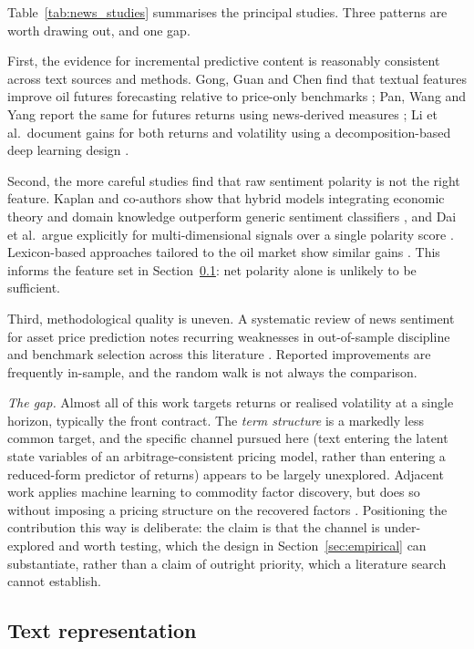 \documentclass[journal]{IEEEtran}
\begin{document}
Table~\ref{tab:news_studies} summarises the principal studies. Three patterns are worth drawing out, and one gap.

First, the evidence for incremental predictive content is reasonably consistent across text sources and methods. Gong, Guan and Chen find that textual features improve oil futures forecasting relative to price-only benchmarks \cite{Gong2022}; Pan, Wang and Yang report the same for futures returns using news-derived measures \cite{Pan2024}; Li et al.\ document gains for both returns and volatility using a decomposition-based deep learning design \cite{Li2021Sentiment}.

Second, the more careful studies find that raw sentiment polarity is not the right feature. Kaplan and co-authors show that hybrid models integrating economic theory and domain knowledge outperform generic sentiment classifiers \cite{Kaplan2023, Kaplan2024}, and Dai et al.\ argue explicitly for multi-dimensional signals over a single polarity score \cite{Dai2026}. Lexicon-based approaches tailored to the oil market show similar gains \cite{Li2025}. This informs the feature set in Section~\ref{sec:features}: net polarity alone is unlikely to be sufficient.

Third, methodological quality is uneven. A systematic review of news sentiment for asset price prediction notes recurring weaknesses in out-of-sample discipline and benchmark selection across this literature \cite{Ehsan2025}. Reported improvements are frequently in-sample, and the random walk is not always the comparison.

\emph{The gap.} Almost all of this work targets returns or realised volatility at a single horizon, typically the front contract. The \emph{term structure} is a markedly less common target, and the specific channel pursued here (text entering the latent state variables of an arbitrage-consistent pricing model, rather than entering a reduced-form predictor of returns) appears to be largely unexplored. Adjacent work applies machine learning to commodity factor discovery, but does so without imposing a pricing structure on the recovered factors \cite{Gupta2025}. Positioning the contribution this way is deliberate: the claim is that the channel is under-explored and worth testing, which the design in Section~\ref{sec:empirical} can substantiate, rather than a claim of outright priority, which a literature search cannot establish.

\subsection{Text representation}
\label{sec:features}
\end{document}
